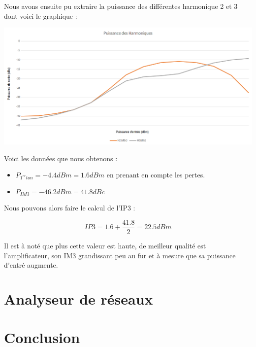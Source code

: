 \documentclass[a4paper,12pt]{report}            %
\begin{document}
    
Nous avons ensuite pu extraire la puissance des différentes harmonique 2 et 3 dont voici le graphique :

\begin{center}\includegraphics[scale = 0.4]{pic/harmonique_graph.png}\\ \end{center}

Voici les données que nous obtenons :
\begin{itemize}
    \item $P_{1^{er}ton} = -4.4dBm = 1.6dBm$ en prenant en compte les pertes.
    \item $P_{IM3} = -46.2dBm = 41.8dBc$
\end{itemize}

Nous pouvons alors faire le calcul de l'IP3 : 

$$IP3 = 1.6 + \frac{41.8}{2} = 22.5dBm $$

Il est à noté que plus cette valeur est haute, de meilleur qualité est l'amplificateur, son IM3
grandissant peu au fur et à mesure que sa puissance d'entré augmente.

\chapter{Analyseur de réseaux}




\chapter{Conclusion}
\end{document}

